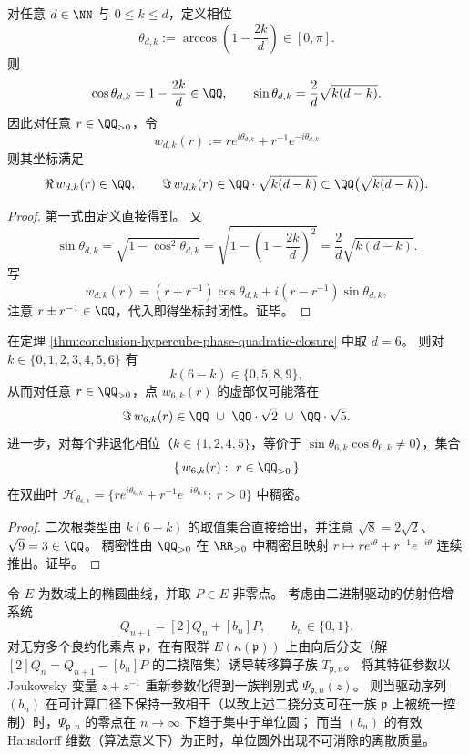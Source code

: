 \begin{theorem}[有理余弦相位的二次体封闭性]\label{thm:conclusion-hypercube-phase-quadratic-closure}
对任意 \(d\in\NN\) 与 \(0\le k\le d\)，定义相位
\[
\theta_{d,k}:=\arccos\!\left(1-\frac{2k}{d}\right)\in[0,\pi].
\]
则
\[
\cos\theta_{d,k}=1-\frac{2k}{d}\in\QQ,
\qquad
\sin\theta_{d,k}=\frac{2}{d}\sqrt{k(d-k)}.
\]
因此对任意 \(r\in\QQ_{>0}\)，令
\[
w_{d,k}(r):=r e^{i\theta_{d,k}}+r^{-1}e^{-i\theta_{d,k}}
\]
则其坐标满足
\[
\Re\,w_{d,k}(r)\in\QQ,
\qquad
\Im\,w_{d,k}(r)\in \QQ\cdot\sqrt{k(d-k)}\subset \QQ\bigl(\sqrt{k(d-k)}\bigr).
\]
\end{theorem}
\begin{proof}
第一式由定义直接得到。
又
\[
\sin\theta_{d,k}=\sqrt{1-\cos^2\theta_{d,k}}
=\sqrt{1-\left(1-\frac{2k}{d}\right)^2}
=\frac{2}{d}\sqrt{k(d-k)}.
\]
写
\[
w_{d,k}(r)=(r+r^{-1})\cos\theta_{d,k}+i(r-r^{-1})\sin\theta_{d,k},
\]
注意 \(r\pm r^{-1}\in\QQ\)，代入即得坐标封闭性。证毕。
\end{proof}

\begin{corollary}[6D 相位仅产生两类不可约二次根]\label{cor:conclusion-hypercube-phase-d6-only-sqrt2-sqrt5}
在定理 \ref{thm:conclusion-hypercube-phase-quadratic-closure} 中取 \(d=6\)。
则对 \(k\in\{0,1,2,3,4,5,6\}\) 有
\[
k(6-k)\in\{0,5,8,9\},
\]
从而对任意 \(r\in\QQ_{>0}\)，点 \(w_{6,k}(r)\) 的虚部仅可能落在
\[
\Im\,w_{6,k}(r)\in \QQ\ \cup\ \QQ\cdot\sqrt2\ \cup\ \QQ\cdot\sqrt5.
\]
进一步，对每个非退化相位（\(k\in\{1,2,4,5\}\)，等价于 \(\sin\theta_{6,k}\cos\theta_{6,k}\neq 0\)），集合
\[
\{\,w_{6,k}(r):\ r\in\QQ_{>0}\,\}
\]
在双曲叶
\(
\mathcal H_{\theta_{6,k}}=\{r e^{i\theta_{6,k}}+r^{-1}e^{-i\theta_{6,k}}:\ r>0\}
\)
中稠密。
\end{corollary}
\begin{proof}
二次根类型由 \(k(6-k)\) 的取值集合直接给出，并注意 \(\sqrt8=2\sqrt2\)、\(\sqrt9=3\in\QQ\)。
稠密性由 \(\QQ_{>0}\) 在 \(\RR_{>0}\) 中稠密且映射 \(r\mapsto r e^{i\theta}+r^{-1}e^{-i\theta}\) 连续推出。证毕。
\end{proof}

\begin{conjecture}[椭圆倍增提升的相干零点原则]\label{conj:conclusion-elliptic-lift-coherent-zero-circle-principle}
令 \(E\) 为数域上的椭圆曲线，并取 \(P\in E\) 非零点。
考虑由二进制驱动的仿射倍增系统
\[
Q_{n+1}=[2]Q_n+[b_n]P,\qquad b_n\in\{0,1\}.
\]
对无穷多个良约化素点 \(\mathfrak p\)，在有限群 \(E(\kappa(\mathfrak p))\) 上由向后分支（解 \([2]Q_n=Q_{n+1}-[b_n]P\) 的二挠陪集）诱导转移算子族 \(T_{\mathfrak p,n}\)。
将其特征参数以 Joukowsky 变量 \(z+z^{-1}\) 重新参数化得到一族判别式 \(\Psi_{\mathfrak p,n}(z)\)。
则当驱动序列 \((b_n)\) 在可计算口径下保持一致相干（以致上述二挠分支可在一族 \(\mathfrak p\) 上被统一控制）时，\(\Psi_{\mathfrak p,n}\) 的零点在 \(n\to\infty\) 下趋于集中于单位圆；
而当 \((b_n)\) 的有效 Hausdorff 维数（算法意义下）为正时，单位圆外出现不可消除的离散质量。
\end{conjecture}

